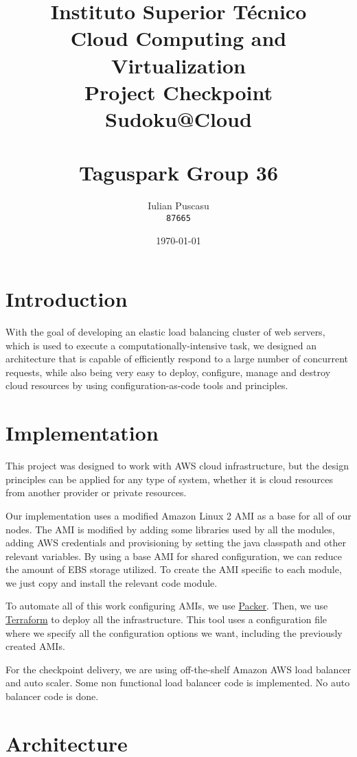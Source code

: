 \documentclass[10pt,twocolumn]{article}
\title{%
Instituto Superior Técnico\\
\huge Cloud Computing and Virtualization\\
\Large Project Checkpoint\\
\Huge Sudoku@Cloud\\
\ \\
\large Taguspark Group 36\\
}
\author{%
    Iulian Puscasu\\
    \texttt{87665}
}
\date{
    \today
}
\begin{document}
\maketitle

\section{Introduction}

With the goal of developing an elastic load balancing cluster of web servers, which is used to execute a computationally-intensive task,
we designed an architecture that is capable of efficiently respond to a large number of concurrent requests, while also being very easy to
deploy, configure, manage and destroy cloud resources by using configuration-as-code tools and principles.


\section{Implementation}

This project was designed to work with AWS cloud infrastructure, but the design principles can be applied for any type of system, whether it is
cloud resources from another provider or private resources.

Our implementation uses a modified Amazon Linux 2 AMI as a base for all of our nodes.
The AMI is modified by adding some libraries used by all the modules, adding AWS credentials and provisioning by setting the java classpath and
other relevant variables. By using a base AMI for shared configuration, we can reduce the amount of EBS storage utilized. To create the AMI
specific to each module, we just copy and install the relevant code module.

To automate all of this work configuring AMIs, we use \href{https://packer.io/}{Packer}.
Then, we use \href{https://www.terraform.io/}{Terraform} to deploy all the infrastructure. This tool uses a configuration file where we specify
all the configuration options we want, including the previously created AMIs.

For the checkpoint delivery, we are using off-the-shelf Amazon AWS load balancer and auto scaler.
Some non functional load balancer code is implemented. No auto balancer code is done.

\section{Architecture}
\end{document}

